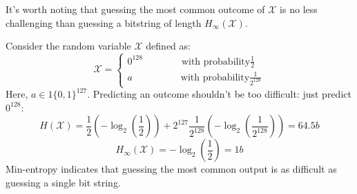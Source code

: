 It's worth noting that guessing the most common outcome of $\mathcal{X}$ is no less challenging than guessing a bitstring of length $H_\infty(\mathcal{X})$.
\begin{example}
    Consider the random variable $\mathcal{X}$ defined as:
    \[\mathcal{X}=\begin{cases}
        0^{128}  \qquad \qquad          \text{with probability} \frac{1}{2}\\
        a        \quad \qquad \qquad    \text{with probability} \frac{1}{2^{128}}
    \end{cases}\]
    Here, $a \in 1\{0,1\}^{127}$.
    Predicting an outcome shouldn't be too difficult: just predict $0^{128}$:
    \[H(\mathcal{X})=\dfrac{1}{2}\left(-\log_2\left(\dfrac{1}{2}\right)\right)+2^{127}\frac{1}{2^{128}}\left(-\log_2\left(\frac{1}{2^{128}}\right)\right)= 64.5b\]
    \[H_\infty(\mathcal{X})=-\log_2\left(\dfrac{1}{2}\right)=1b\]
    Min-entropy indicates that guessing the most common output is as difficult as guessing a single bit string.
\end{example}